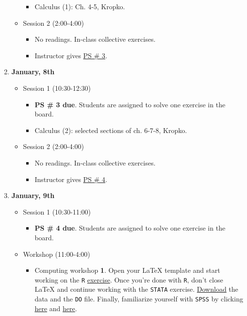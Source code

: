 \documentclass[10pt]{article}
\begin{document}
\begin{enumerate}
\begin{itemize}
\begin{itemize}
				\item Calculus (1): Ch. 4-5, Kropko.
				\end{itemize}
			\item Session 2 (2:00-4:00)
				\begin{itemize}
				\item No readings. In-class collective exercises.
				\item Instructor gives \href{http://gofile.me/2nH49/SkteA09p}{PS \# 3}.
				\end{itemize}
		\end{itemize}
\item {\bf January, 8th}
		\begin{itemize}
			\item Session 1 (10:30-12:30)
				\begin{itemize}
				\item {\bf PS \# 3 due}. Students are assigned to solve one exercise in the board.
				\item Calculus (2): selected sections of ch. 6-7-8, Kropko.
				\end{itemize}
			\item Session 2 (2:00-4:00)
				\begin{itemize}
				\item No readings. In-class collective exercises.
				\item Instructor gives \href{http://gofile.me/2nH49/3Ed5Wn7g}{PS \# 4}.
				\end{itemize}
		\end{itemize}
\item {\bf January, 9th}
		\begin{itemize}
			\item Session 1 (10:30-11:00)
				\begin{itemize}
				\item {\bf PS \# 4 due}. Students are assigned to solve one exercise in the board.
				\end{itemize}
			\item Workshop (11:00-4:00)
				\begin{itemize}
				\item Computing workshop {\bf 1}. Open your \LaTeX \; template and start working on the \texttt{R} \href{http://gofile.me/2nH49/MDgf2bcN}{exercise}. Once you're done with \texttt{R}, don't close \LaTeX \; and continue working with the \texttt{STATA} exercise. \href{http://gofile.me/2nH49/xBD2Pfl5}{Download} the data and the \texttt{DO} file. Finally, familiarize yourself with \texttt{SPSS} by clicking \href{http://www.ats.ucla.edu/stat/spss/output/descriptives.htm}{here} and \href{http://www.ats.ucla.edu/stat/spss/output/reg_spss_long.htm}{here}.

\end{itemize}
\end{itemize}
\end{enumerate}
\end{document}
